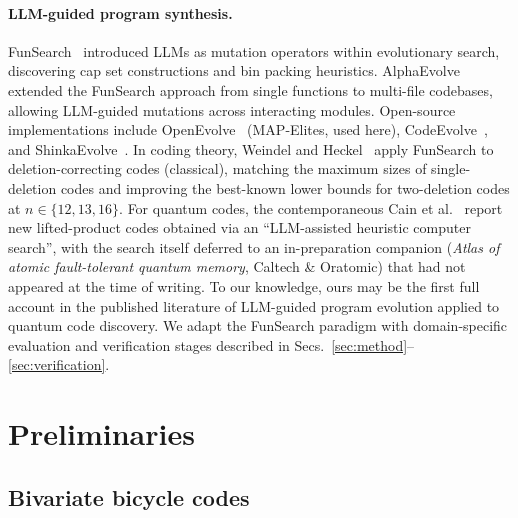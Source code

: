 \documentclass[aps,prxquantum,twocolumn,superscriptaddress,nofootinbib]{revtex4-2}
\begin{document}
\paragraph{LLM-guided program synthesis.}

FunSearch~\cite{romera2024funsearch} introduced LLMs as mutation operators within evolutionary search, discovering cap set constructions and bin packing heuristics.
AlphaEvolve~\cite{novikov2025alphaevolve} extended the FunSearch approach from single functions to multi-file codebases, allowing LLM-guided mutations across interacting modules.
Open-source implementations include OpenEvolve~\cite{openevolve} (MAP-Elites, used here), CodeEvolve~\cite{codeevolve2026}, and ShinkaEvolve~\cite{lange2025shinkaevolve}.
In coding theory, Weindel and Heckel~\cite{weindel2025llmguided} apply FunSearch to deletion-correcting codes (classical), matching the maximum sizes of single-deletion codes and improving the best-known lower bounds for two-deletion codes at $n \in \{12, 13, 16\}$.
For quantum codes, the contemporaneous Cain et al.~\cite{cain2026shor} report new lifted-product codes obtained via an ``LLM-assisted heuristic computer search'', with the search itself deferred to an in-preparation companion (\textit{Atlas of atomic fault-tolerant quantum memory}, Caltech \& Oratomic) that had not appeared at the time of writing.
To our knowledge, ours may be the first full account in the published literature of LLM-guided program evolution applied to quantum code discovery.
We adapt the FunSearch paradigm with domain-specific evaluation and verification stages described in Secs.~\ref{sec:method}--\ref{sec:verification}.

\section{Preliminaries}
\label{sec:prelim}

\subsection{Bivariate bicycle codes}
\label{sec:bb}
\end{document}
